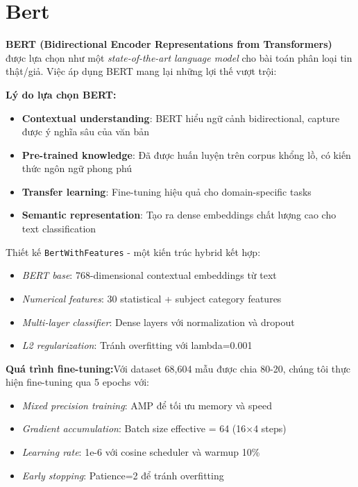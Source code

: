 \section{Bert}

\textbf{BERT (Bidirectional Encoder Representations from Transformers)} được lựa chọn như một \textit{state-of-the-art language model} cho bài toán phân loại tin thật/giả. Việc áp dụng BERT mang lại những lợi thế vượt trội:

\noindent\textbf{Lý do lựa chọn BERT:}
\begin{itemize}
    \item \textbf{Contextual understanding}: BERT hiểu ngữ cảnh bidirectional, capture được ý nghĩa sâu của văn bản
    \item \textbf{Pre-trained knowledge}: Đã được huấn luyện trên corpus khổng lồ, có kiến thức ngôn ngữ phong phú
    \item \textbf{Transfer learning}: Fine-tuning hiệu quả cho domain-specific tasks
    \item \textbf{Semantic representation}: Tạo ra dense embeddings chất lượng cao cho text classification
\end{itemize}

\noindent Thiết kế \texttt{BertWithFeatures} - một kiến trúc hybrid kết hợp:
\begin{itemize}
    \item \textit{BERT base}: 768-dimensional contextual embeddings từ text
    \item \textit{Numerical features}: 30 statistical + subject category features
    \item \textit{Multi-layer classifier}: Dense layers với normalization và dropout
    \item \textit{L2 regularization}: Tránh overfitting với lambda=0.001
\end{itemize}

\noindent\textbf{Quá trình fine-tuning:}Với dataset 68,604 mẫu được chia 80-20, chúng tôi thực hiện fine-tuning qua 5 epochs với:
\begin{itemize}
    \item \textit{Mixed precision training}: AMP để tối ưu memory và speed
    \item \textit{Gradient accumulation}: Batch size effective = 64 (16×4 steps)
    \item \textit{Learning rate}: 1e-6 với cosine scheduler và warmup 10\%
    \item \textit{Early stopping}: Patience=2 để tránh overfitting
\end{itemize}

